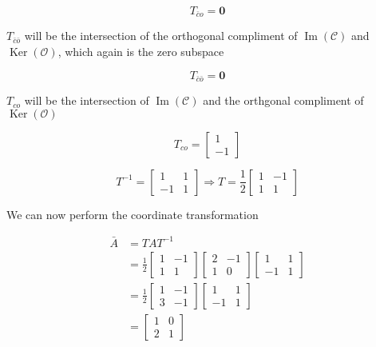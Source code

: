 \documentclass{article}
\begin{document}
\[
T_{\bar c o} = \mathbf{0}
\]

$T_{\bar c \bar o}$ will be the intersection of the orthogonal compliment of $\operatorname{Im}(\mathcal{C})$ and $\operatorname{Ker}(\mathcal{O})$, which again is the zero subspace

\[
T_{\bar c \bar o} = \mathbf{0}
\]

$T_{c o}$ will be the intersection of $\operatorname{Im}(\mathcal{C})$ and the orthgonal compliment of $\operatorname{Ker}(\mathcal{O})$

\[
T_{c o} = 
\begin{bmatrix}
    1 \\
    -1
\end{bmatrix}
\]

\[
T^{-1} = 
\begin{bmatrix}
    1 & 1 \\
    -1 & 1
\end{bmatrix}
\Rightarrow
T = 
\frac{1}{2}
\begin{bmatrix}
    1 & -1 \\
    1 & 1
\end{bmatrix}
\]

We can now perform the coordinate transformation

\begin{align*}
    \bar A &= T A T^{-1} \\
    &=
    \frac{1}{2}
    \begin{bmatrix}
        1 & -1 \\
        1 & 1
    \end{bmatrix}
    \begin{bmatrix}
        2 & -1 \\
        1 & 0
    \end{bmatrix}
    \begin{bmatrix}
        1 & 1 \\
        -1 & 1
    \end{bmatrix} \\
    &= \frac{1}{2}
    \begin{bmatrix}
        1 & -1 \\
        3 & -1 
    \end{bmatrix}
    \begin{bmatrix}
        1 & 1 \\
        -1 & 1
    \end{bmatrix} \\
    &= 
    \begin{bmatrix}
        1 & 0 \\
        2 & 1
    \end{bmatrix}
\end{align*}
\end{document}

